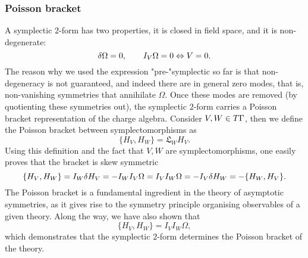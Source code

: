 \subsubsection*{Poisson bracket}
A symplectic $2$-form has two properties, it is closed in field space, and it is non-degenerate:
\begin{equation}
	\delta\Omega=0,\qquad I_V\Omega=0\Leftrightarrow V=0.
\end{equation}
The reason why we used the expression "pre-"symplectic so far is that non-degeneracy is not guaranteed, and indeed there are in general zero modes, that is, non-vanishing symmetries that annihilate $\Omega$. Once these modes are removed (by quotienting these symmetries out), the symplectic $2$-form carries a Poisson bracket representation of the charge algebra. Consider $V,W\in T\Gamma $, then we define the Poisson bracket between symplectomorphisms as
\begin{equation}\label{28}
	\{H_V,H_W\}=\mathfrak{L}_W H_V.
\end{equation}
Using this definition and the fact that $V,W$ are symplectomorphisms, one easily proves that the bracket is skew symmetric
\begin{equation}\label{29}
	\{H_V,H_W\}=I_W\delta H_V=-I_WI_V\Omega=I_VI_W\Omega=-I_V\delta H_W=-\{H_W,H_V\}.
\end{equation}
The Poisson bracket is a fundamental ingredient in the theory of asymptotic symmetries, as it gives rise to the symmetry principle organising observables of a given theory. Along the way, we have also shown that
\begin{equation}\label{30}
	\{H_V,H_W\}=I_VI_W\Omega,
\end{equation}
 which demonstrates that the symplectic $2$-form determines the Poisson bracket of the theory.
 
